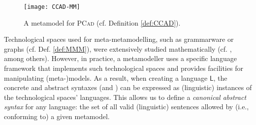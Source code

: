 \begin{olddef}
\begin{Example}
\begin{figure}[t]
   \centering
   \texttt{[image: CCAD-MM]}
   \caption{A metamodel for \textsc{PCad} (cf. Definition 
\ref{def:CCAD}).}%
   \label{fig:PCAD-MM}%
\end{figure}
\end{Example}
\end{olddef}

Technological spaces used for meta-metamodelling, such as grammarware or 
graphs (cf. Def. \ref{def:MMM}), were 
extensively studied mathematically (cf. 
\cite{B:Rozenberg:1997,B:Aho-etAl:2006}, among others). However, in practice, a metamodeller uses a specific language framework that implements such technological spaces and provides facilities for manipulating (meta-)models. As a result, when creating a language $\mathsf{L}$, the concrete and abstract syntaxes (\CS and \AS) can be
expressed as (linguistic) instances of the technological spaces' languages. 
This allows us to define a \emph{canonical abstract syntax} for any language: the set of all valid (linguistic) sentences allowed by (i.e., conforming to) a given metamodel.

